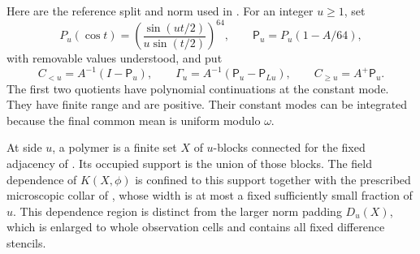 Here are the reference split and norm used in \cite{F}.  For an integer
$u\ge1$, set
\[
 P_u(\cos t)=\left(\frac{\sin(ut/2)}{u\sin(t/2)}\right)^{64},
 \qquad \mathsf P_u=P_u(1-A/64),
\]
with removable values understood, and put
\begin{equation}\label{eq:reference-split}
 C_{<u}=A^{-1}(I-\mathsf P_u),\qquad
 \Gamma_u=A^{-1}(\mathsf P_u-\mathsf P_{Lu}),\qquad
 C_{\ge u}=A^+\mathsf P_u.
\end{equation}
The first two quotients have polynomial continuations at the constant
mode.  They have finite range and are positive.  Their constant modes
can be integrated because the final common mean is uniform modulo
$\omega$.

At side $u$, a polymer is a finite set $X$ of $u$-blocks connected for
the fixed adjacency of \cite{F}.  Its occupied support is the union of
those blocks.  The field dependence of $K(X,\phi)$ is confined to this
support together with the prescribed microscopic collar of
\cite[Proposition~4.1]{F}, whose width is at most a fixed sufficiently
small fraction of $u$.  This dependence region is distinct from the
larger norm padding $D_u(X)$, which is enlarged to whole observation
cells and contains all fixed difference stencils.

